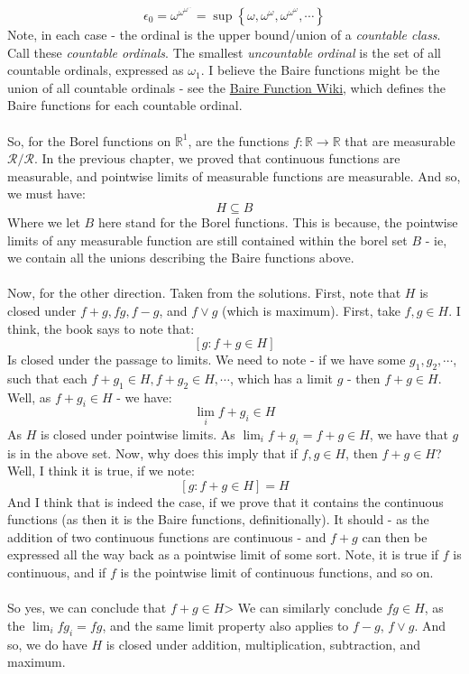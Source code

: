 \documentclass[12pt,a4paper]{article}
\newcommand{\1}[1]{\mathbbm{1}\left\{ #1 \right\}}
\newcommand{\R}{\mathbb{R}}
\newcommand{\rcal}{\mathcal{R}}
\begin{document}
$$
	\epsilon_0 = \omega^{\omega^{\omega^{\cdots}}} = \sup\left\{\omega, \omega^\omega, \omega^{\omega^{\omega}}, \cdots\right\}
$$
Note, in each case - the ordinal is the upper bound/union of a \textit{countable class}. Call these \textit{countable ordinals}. The smallest \textit{uncountable ordinal} is the set of all countable ordinals, expressed as $\omega_1$. I believe the Baire functions might be the union of all countable ordinals - see the \href{https://en.wikipedia.org/wiki/Baire_function}{Baire Function Wiki}, which defines the Baire functions for each countable ordinal. 
\\\\
So, for the Borel functions on $\R^1$, are the functions $f: \R \to \R$ that are measurable $\rcal/\rcal$. In the previous chapter, we proved that continuous functions are measurable, and pointwise limits of measurable functions are measurable. And so, we must have:
$$
	H \subseteq B
$$
Where we let $B$ here stand for the Borel functions. This is because, the pointwise limits of any measurable function are still contained within the borel set $B$ - ie, we contain all the unions describing the Baire functions above.
\\\\
Now, for the other direction. Taken from the solutions. First, note that $H$ is closed under $f + g, fg, f - g$, and $f \vee g$ (which is maximum). First, take $f,g \in H$. I think, the book says to note that:
$$
	[g: f + g \in H]
$$
Is closed under the passage to limits. We need to note - if we have some $g_1, g_2, \cdots$, such that each $f + g_1 \in H, f + g_2 \in H, \cdots$, which has a limit $g$ - then $f + g \in H$. Well, as $f + g_i \in H$ - we have:
$$
	\lim_i f + g_i \in H
$$
As $H$ is closed under pointwise limits. As $\lim_i f + g_i = f + g \in H$, we have that $g$ is in the above set. Now, why does this imply that if $f,g \in H$, then $f + g \in H$? Well, I think it is true, if we note:
$$
	[g: f + g \in H] = H
$$
And I think that is indeed the case, if we prove that it contains the continuous functions (as then it is the Baire functions, definitionally). It should - as the addition of two continuous functions are continuous - and $f + g$ can then be expressed all the way back as a pointwise limit of some sort. Note, it is true if $f$ is continuous, and if $f$ is the pointwise limit of continuous functions, and so on.
\\\\
So yes, we can conclude that $f + g \in H$> We can similarly conclude $fg \in H$, as the $\lim_i fg_i = fg$, and the same limit property also applies to $f - g$, $f \vee g$. And so, we do have $H$ is closed under addition, multiplication, subtraction, and maximum.
\end{document}
